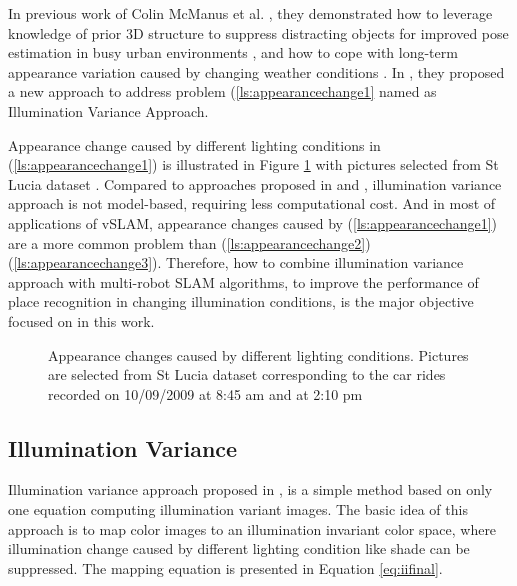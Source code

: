 In previous work of Colin McManus et al. , they demonstrated how to leverage knowledge of prior 3D structure to suppress distracting objects for improved pose estimation in busy urban environments \cite{mcmanus2013distraction}, and how to cope with long-term appearance variation caused by changing weather conditions \cite{churchill2012practice}. In \cite{maddern2014illumination}, they proposed a new approach to address problem (\ref{ls:appearancechange1} named as Illumination Variance Approach. 

Appearance change caused by different lighting conditions in (\ref{ls:appearancechange1}) is illustrated in Figure \ref{fig:shadecompare1} with pictures selected from St Lucia dataset \cite{glover2010fab}. Compared to approaches proposed in \cite{mcmanus2013distraction} and \cite{churchill2012practice}, illumination variance approach is not model-based, requiring less computational cost. And in most of applications of vSLAM, appearance changes caused by (\ref{ls:appearancechange1}) are a more common problem than (\ref{ls:appearancechange2})(\ref{ls:appearancechange3}). Therefore, how to combine illumination variance approach with multi-robot SLAM algorithms, to improve the performance of place recognition in changing illumination conditions, is the major objective focused on in this work.

\begin{figure}
	\centering
\caption{Appearance changes caused by different lighting conditions. Pictures are selected from St Lucia dataset corresponding to the car rides recorded on 10/09/2009 at 8:45 am and at 2:10 pm}
\label{fig:shadecompare1}
\end{figure}


\subsection{Illumination Variance}
Illumination variance approach proposed in \cite{maddern2014illumination}, is a simple method based on only one equation computing illumination variant images. The basic idea of this approach is to map color images to an illumination invariant color space, where illumination change caused by different lighting condition like shade can be suppressed. The mapping equation
 is presented in Equation \ref{eq:iifinal}.
 
